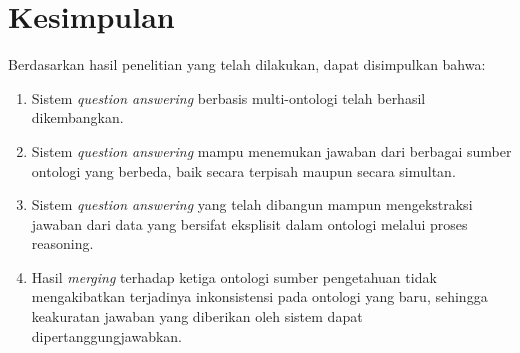 \section{Kesimpulan}
Berdasarkan hasil penelitian yang telah dilakukan, dapat disimpulkan bahwa:
\begin{enumerate}
	\item Sistem \emph{question answering} berbasis multi-ontologi telah berhasil dikembangkan.
	\item Sistem \emph{question answering} mampu menemukan jawaban dari berbagai sumber ontologi yang berbeda, baik secara terpisah maupun secara simultan.
	\item Sistem \emph{question answering} yang telah dibangun mampun mengekstraksi jawaban dari data yang bersifat eksplisit dalam ontologi melalui proses reasoning.
	\item Hasil \emph{merging} terhadap ketiga ontologi sumber pengetahuan tidak mengakibatkan terjadinya inkonsistensi pada ontologi yang baru, sehingga keakuratan jawaban yang diberikan oleh sistem dapat dipertanggungjawabkan.
\end{enumerate}